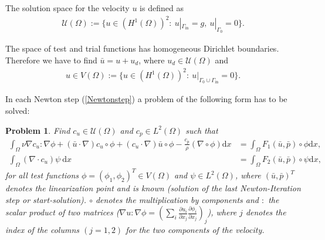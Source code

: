 \documentclass[a4paper, 11pt, twoside]{article}
\newcommand{\dd}{\mathrm{d}}
\newtheorem{problem}{Problem}[section]
\begin{document}
The solution space for the velocity $u$ is defined as 
\begin{align*}
 \mathcal{U}(\Omega) := \{ u\in (H^1(\Omega))^2: \ u|_{\Gamma_{\text{in}}} = g ,
\ u|_{\Gamma_0}= 0 \}.
\end{align*}

The space of test and trial functions has homogeneous Dirichlet boundaries. 
Therefore we have to find $\bar{u}= u+u_d$, where $u_d \in \mathcal{U}(\Omega)$ and
\begin{align*}
u\in   V(\Omega) := \{ u\in (H^1(\Omega))^2 : \
u|_{\Gamma_0 \cup \Gamma_{\text{in}}}= 0\}.
\end{align*} 
  
In each Newton step (\ref{Newtonstep}) a problem of the following form has to be solved:
\begin{problem}
Find $c_u\in \mathcal{U}(\Omega)$ and $c_p\in L^2(\Omega)$ such that
\begin{equation} 
\begin{aligned}
  \int_{\Omega}\nu \nabla c_u : \nabla \phi + (\bar{u} \cdot \nabla) c_u \circ \phi + (c_u \cdot \nabla) \bar{u} \circ \phi
 - \frac{c_p}{\rho} (\nabla \circ \phi) \dd x &= \int_{\Omega} F_1(\bar{u},\bar{p}) \circ \phi \dd x ,\\ 
  \int_{\Omega} (\nabla \cdot c_u) \psi \ \dd x &= \int_{\Omega} F_2(\bar{u},\bar{p}) \circ \psi \dd x ,
 \end{aligned}\label{eq:NS_schwach} 
\end{equation}
for all test functions $\phi =(\phi_1,\phi_2)^T \in V(\Omega)$ and $\psi \in L^2(\Omega)$, where $(\bar{u},\bar{p})^T$ denotes the linearization point and is known (solution of the last Newton-Iteration step or start-solution). $\circ$ 
denotes the multiplication by components and $:$ the scalar product of two matrices 
($\nabla u : \nabla \phi = (\sum_{i} \frac{\partial u_i}{\partial x_j} \frac{\partial \phi_i}{\partial x_j})_j$), where $j$ denotes the index of the columns $(j=1,2)$ for the two components of the velocity.\\
\end{problem}
\end{document}

